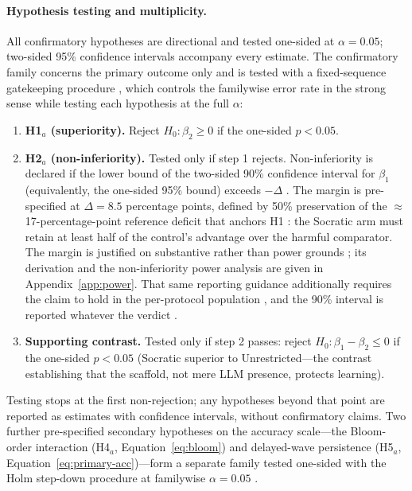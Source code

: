 \paragraph{Hypothesis testing and multiplicity.}
All confirmatory hypotheses are directional and tested one-sided at $\alpha = 0.05$; two-sided 95\% confidence intervals accompany every estimate. The confirmatory family concerns the primary outcome only and is tested with a fixed-sequence gatekeeping procedure \parencite{maurer1995,bauer1991,dmitrienko2013}, which controls the familywise error rate in the strong sense while testing each hypothesis at the full $\alpha$:
\begin{enumerate}
    \item \textbf{H1$_a$ (superiority).} Reject $H_0\colon \beta_2 \ge 0$ if the one-sided $p < 0.05$.
    \item \textbf{H2$_a$ (non-inferiority).} Tested only if step 1 rejects. Non-inferiority is declared if the lower bound of the two-sided 90\% confidence interval for $\beta_1$ (equivalently, the one-sided 95\% bound) exceeds $-\Delta$ \parencite{schuirmann1987,lakens2017,lakens2018}. The margin is pre-specified at $\Delta = 8.5$ percentage points, defined by 50\% preservation of the $\approx$17-percentage-point reference deficit that anchors H1 \parencite{shen2026}: the Socratic arm must retain at least half of the control's advantage over the harmful comparator. The margin is justified on substantive rather than power grounds \parencite{piaggio2012,ema2005,althunian2017,dagostino2003}; its derivation and the non-inferiority power analysis are given in Appendix~\ref{app:power}. %
    That same reporting guidance additionally requires the claim to hold in the per-protocol population \parencite{piaggio2012}, and the 90\% interval is reported whatever the verdict \parencite{cumming2014}.
    \item \textbf{Supporting contrast.} Tested only if step 2 passes: reject $H_0\colon \beta_1 - \beta_2 \le 0$ if the one-sided $p < 0.05$ (Socratic superior to Unrestricted---the contrast establishing that the scaffold, not mere LLM presence, protects learning).
\end{enumerate}
Testing stops at the first non-rejection; any hypotheses beyond that point are reported as estimates with confidence intervals, without confirmatory claims. Two further pre-specified secondary hypotheses on the accuracy scale---the Bloom-order interaction (H4$_a$, Equation~\eqref{eq:bloom}) and delayed-wave persistence (H5$_a$, Equation~\eqref{eq:primary-acc})---form a separate family tested one-sided with the Holm step-down procedure at familywise $\alpha = 0.05$ \parencite{holm1979}. %
